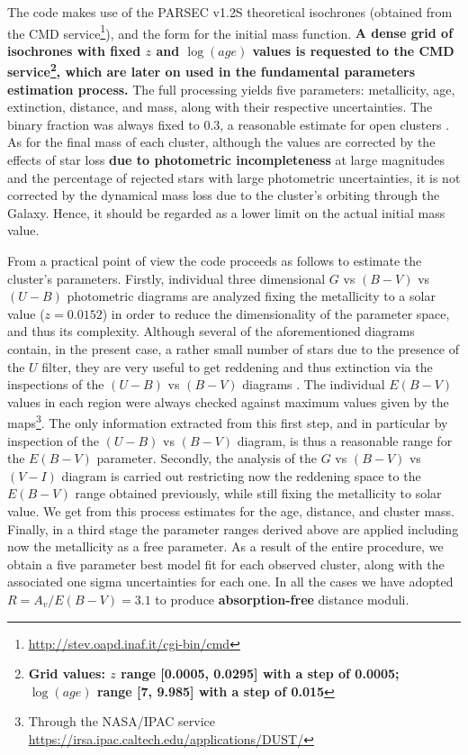 \documentclass[referee]{aa}
\begin{document}
The code makes use of the PARSEC v1.2S \citep{Bressan_2012} theoretical
isochrones (obtained from the CMD
service\footnote{\url{http://stev.oapd.inaf.it/cgi-bin/cmd}}), and the
\cite{Kroupa_2002} form for the initial mass function. \textbf{A dense grid of
isochrones with fixed $z$ and $\log(age)$ values is requested to the CMD
service\footnote{\textbf{Grid values: $z$ range [0.0005, 0.0295] with a step of
0.0005; $\log(age)$ range [7, 9.985] with a step of 0.015}}, which are later on
used in the fundamental parameters estimation
process.} The full processing yields five parameters: metallicity, age,
extinction, distance, and mass, along with their respective uncertainties. The
binary fraction was always fixed to 0.3, a reasonable
estimate for open clusters \citep{Sollima_2010}. As for the final mass of each
cluster, although the values are corrected by the effects of star loss
\textbf{due to photometric incompleteness} at large magnitudes and the
percentage of rejected stars with large photometric uncertainties, it is not
corrected by the dynamical mass loss due to the cluster's orbiting through the
Galaxy. Hence, it should be regarded as a lower limit on the actual initial
mass value.

From a practical point of view the code proceeds as follows to estimate the
cluster's parameters. Firstly, individual three dimensional $G$ vs $(B-V)$ vs $
(U-B)$ photometric diagrams are analyzed fixing the metallicity to a solar
value ($z = 0.0152$) in order to reduce the dimensionality of the parameter
space, and thus its complexity. Although several of the aforementioned diagrams
contain, in the present case, a rather small number of stars due to the
presence of the $U$ filter, they are very useful to get reddening and thus
extinction via the inspections of the $(U-B)$ vs $(B-V)$ diagrams
\citep[e.g.,][]{Vazquez2008} .
The individual $E(B-V)$ values in each region were always checked against
maximum values given by the \cite{Schlafly_2011} maps\footnote{Through the
NASA/IPAC service \url{https://irsa.ipac.caltech.edu/applications/DUST/}}.
The only information extracted from this first step, and in particular
by inspection of the $(U-B)$ vs $(B-V)$ diagram, is thus a reasonable range for
the $E(B-V)$ parameter.
%
Secondly, the analysis of the $G$ vs $(B-V)$ vs $(V-I)$ diagram is carried out
restricting now the reddening space to the $E(B-V)$ range obtained previously,
while still fixing the metallicity to solar value. We get from this process
estimates for the age, distance, and cluster mass.
%
Finally, in a third stage the parameter ranges derived above are applied
including now the metallicity as a free parameter.
As a result of the entire procedure, we obtain a five parameter best model fit
for each observed cluster, along with the associated one sigma uncertainties
for each one. In all the cases we have adopted $R=A_v/E(B-V) = 3.1$ to produce 
\textbf{absorption-free} distance moduli.
\end{document}
